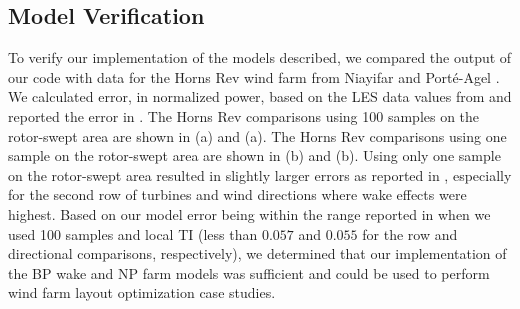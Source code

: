 \documentclass[conf]{new-aiaa}
\begin{document}
\subsection{Model Verification}
To verify our implementation of the models described, we compared the output of our code with data for the Horns Rev wind farm from Niayifar and Port\'{e}-Agel \cite{niayifar2016}. We calculated error, in normalized power, based on the LES data values from \cite{niayifar2016} and reported the error in . The Horns Rev comparisons using 100 samples on the rotor-swept area are shown in (a) and (a). The Horns Rev comparisons using one sample on the rotor-swept area are shown in (b) and (b). Using only one sample on the rotor-swept area resulted in slightly larger errors as reported in , especially for the second row of turbines and wind directions where wake effects were highest. Based on our model error being within the range reported in \cite{niayifar2016} when we used 100 samples and local TI (less than $0.057$ and $0.055$ for the row and directional comparisons, respectively), we determined that our implementation of the BP wake and NP farm models was sufficient and could be used to perform wind farm layout optimization case studies.
\end{document}

